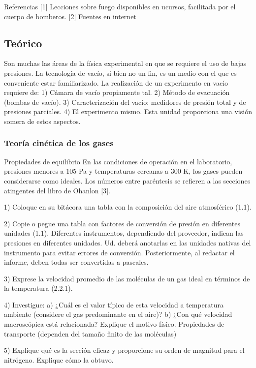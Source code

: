 \documentclass[letterpaper,11pt]{article}
\begin{document}
Referencias
[1] Lecciones sobre fuego disponibles en ucursos, facilitada por el cuerpo de bomberos.
[2] Fuentes en internet

\subsection{Teórico}

Son muchas las áreas de la física experimental en que se requiere el uso de bajas presiones.
La tecnología de vacío, si bien no un fin, es un medio con el que es conveniente estar
familiarizado. La realización de un experimento en vacío requiere de:
1) Cámara de vacío propiamente tal.
2) Método de evacuación (bombas de vacío).
3) Caracterización del vacío: medidores de presión total y de presiones parciales.
4) El experimento mismo.
Esta unidad proporciona una visión somera de estos aspectos.

\subsubsection{Teoría cinética de los gases} 

Propiedades de equilibrio
En las condiciones de operación en el laboratorio, presiones menores a 105 Pa y temperaturas cercanas a 300 K, los gases pueden considerarse como ideales. Los números entre paréntesis se refieren a las secciones atingentes del libro de Ohanlon [3].

1) Coloque en su bitácora una tabla con la composición del aire atmosférico (1.1).

2) Copie o pegue una tabla con factores de conversión de presión en diferentes
unidades (1.1). Diferentes instrumentos, dependiendo del proveedor, indican las
presiones en diferentes unidades. Ud. deberá anotarlas en las unidades nativas del
instrumento para evitar errores de conversión. Posteriormente, al redactar el
informe, deben todas ser convertidas a pascales.

3) Exprese la velocidad promedio de las moléculas de un gas ideal en términos de la
temperatura (2.2.1).

4) Investigue:
a) ¿Cuál es el valor típico de esta velocidad a temperatura ambiente (considere
el gas predominante en el aire)?
b) ¿Con qué velocidad macroscópica está relacionada? Explique el motivo
físico.
Propiedades de transporte (dependen del tamaño finito de las moléculas)

5) Explique qué es la sección eficaz y proporcione su orden de magnitud para el
nitrógeno. Explique cómo la obtuvo.
\end{document}
